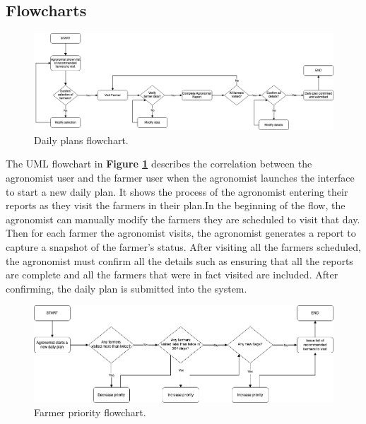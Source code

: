 \subsection{Flowcharts}


\begin{figure}[hbt!]
\centering
\includegraphics[scale=0.4]{../images_diagrams/agronomistexecutesplan.png}
\caption{\label{fig:flowAgronomistReport}Daily plans flowchart.}
\end{figure}

\begin{flushleft}
The UML flowchart in \textbf{Figure \ref{fig:flowAgronomistReport}} describes the correlation between the agronomist user and the farmer user when the agronomist launches the interface to start a new daily plan. It shows the process of the agronomist entering their reports as they visit the farmers in their plan.In the beginning of the flow, the agronomist can manually modify the farmers they are scheduled to visit that day. Then for each farmer the agronomist visits, the agronomist generates a report to capture a snapshot of the farmer's status. After visiting all the farmers scheduled, the agronomist must confirm all the details such as ensuring that all the reports are complete and all the farmers that were in fact visited are included. After confirming, the daily plan is submitted into the system.
\end{flushleft}

\begin{figure}[hbt!]
\centering
\includegraphics[scale=0.4]{../images_diagrams/adjustvisitpriority.png}
\caption{\label{fig:flowPriority}Farmer priority flowchart.}
\end{figure}


